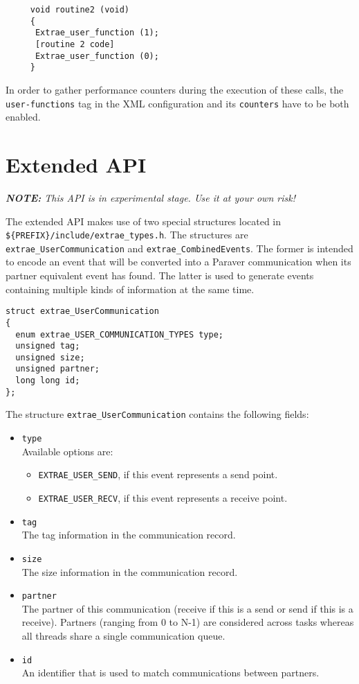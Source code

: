 \begin{itemize}
\begin{verbatim}
     void routine2 (void)
     {
      Extrae_user_function (1);
      [routine 2 code]
      Extrae_user_function (0);
     }
   \end{verbatim}
   In order to gather performance counters during the execution of these calls, the {\tt user-functions} tag in the XML configuration and its {\tt counters} have to be both enabled.

\end{itemize}

\section{Extended API}\label{sec:ExtendedAPI}

{\em {\bf NOTE:} This API is in experimental stage. Use it at your own risk!}

The extended API makes use of two special structures located in {\tt \$\{PREFIX\}/include/extrae\_types.h}. The structures are {\tt extrae\_UserCommunication} and {\tt extrae\_CombinedEvents}. The former is intended to encode an event that will be converted into a Paraver communication when its partner equivalent event has found. The latter is used to generate events containing multiple kinds of information at the same time.

\begin{verbatim}
struct extrae_UserCommunication
{
  enum extrae_USER_COMMUNICATION_TYPES type;
  unsigned tag;
  unsigned size;
  unsigned partner;
  long long id;
};
\end{verbatim}

The structure {\tt extrae\_UserCommunication} contains the following fields:
\begin{itemize}
	\item {\tt type}\\
	Available options are:
	\begin{itemize}
		\item {\tt EXTRAE\_USER\_SEND}, if this event represents a send point.
		\item {\tt EXTRAE\_USER\_RECV}, if this event represents a receive point.
	\end{itemize}
	\item {\tt tag}\\
	The tag information in the communication record. 
	\item {\tt size}\\
	The size information in the communication record.
	\item {\tt partner}\\
	The partner of this communication (receive if this is a send or send if this is a receive). Partners (ranging from 0 to N-1) are considered across tasks whereas all threads share a single communication queue.
	\item {\tt id}\\
	An identifier that is used to match communications between partners.
\end{itemize}

